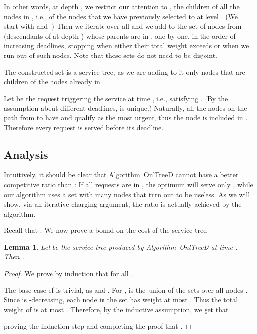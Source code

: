 \documentclass[a4paper]{article}
\newtheorem{lemma}[theorem]{Lemma}
\newcommand{\OnAlgTreesDeadlines}{{\sc OnlTreeD}}
\begin{document}
In other words, at depth , we restrict our attention to , the
children of all the nodes in , i.e., of the nodes that we
have previously selected to  at level . (We start with 
and .) Then we iterate over all  and
we add to  the set  of nodes from 
(descendants of  at depth ) whose parents are in , one by
one, in the order of increasing deadlines, stopping when either their
total weight exceeds  or when we run out of such
nodes. Note that these sets do not need to be disjoint.

The constructed set  is a service tree, as we are adding to it only
nodes that are children of the nodes already in .

Let  be the request triggering the service at time , i.e.,
satisfying .  (By the assumption about different deadlines,
 is unique.)  Naturally, all the nodes  on the path from 
to  have  and qualify as the most urgent,
thus the node  is included in . Therefore every
request is served before its deadline.




\subsection{Analysis}

Intuitively, it should be clear that Algorithm~{\OnAlgTreesDeadlines}
cannot have a better competitive ratio than : If all
requests are in , the optimum will serve only , while our
algorithm uses a set  with many nodes that turn out to be
useless. As we will show, via an iterative charging argument, the ratio
 is actually achieved by the algorithm.

Recall that .
We now prove a bound on the cost of the service tree.

\begin{lemma}\label{l:d:complete} 
Let  be the service tree produced by
Algorithm~{\OnAlgTreesDeadlines} at time .  Then .
\end{lemma}

\begin{proof}
We prove by induction that  for all .

The base case of  is trivial, as  and
.  For ,  is the~union of the sets 
over all nodes . Since  is -decreasing, each
node in the set  has weight at most .  Thus
the total weight of  is at most
.
Therefore, by the inductive assumption, we get that

proving the induction step and completing the proof that 
.
\end{proof}
\end{document}
